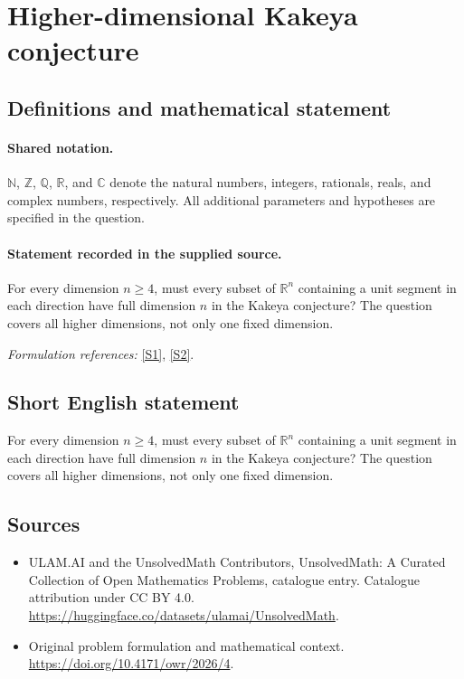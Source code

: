 \documentclass[11pt]{article}
\newcommand{\sref}[2]{\hyperlink{source:#1:#2}{[S#2]}}
\begin{document}
\section{Higher-dimensional Kakeya conjecture}\label{statement}

\subsection{Definitions and mathematical statement}

\paragraph{Shared notation.}$\mathbb N$, $\mathbb Z$, $\mathbb Q$, $\mathbb R$, and $\mathbb C$ denote the natural numbers, integers, rationals, reals, and complex numbers, respectively. All additional parameters and hypotheses are specified in the question.


\paragraph{Statement recorded in the supplied source.}
For every dimension $n\geq4$, must every subset of $\mathbb R^n$ containing a unit segment in each direction have full dimension $n$ in the Kakeya conjecture? The question covers all higher dimensions, not only one fixed dimension.
\par\smallskip\textit{Formulation references:} \sref{statement}{1}, \sref{statement}{2}.
\subsection{Short English statement}
For every dimension $n\geq4$, must every subset of $\mathbb R^n$ containing a unit segment in each direction have full dimension $n$ in the Kakeya conjecture? The question covers all higher dimensions, not only one fixed dimension.
\subsection{Sources}
\begin{itemize}
\item[\hypertarget{source:statement:1}{S1}] ULAM.AI and the UnsolvedMath Contributors, UnsolvedMath: A Curated Collection of Open Mathematics Problems, catalogue entry. Catalogue attribution under CC BY 4.0.
\url{https://huggingface.co/datasets/ulamai/UnsolvedMath}.
\item[\hypertarget{source:statement:2}{S2}] Original problem formulation and mathematical context.
\url{https://doi.org/10.4171/owr/2026/4}.
\end{itemize}
\label{end:statement}
\end{document}
